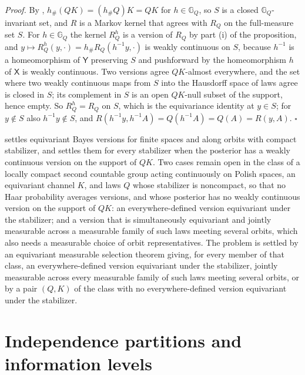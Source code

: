 \noindent\emph{Proof.}
By , $h_\#(QK)=(h_\#Q)K=QK$ for $h\in\mathbb G_Q$, so $S$ is a
closed $\mathbb G_Q$-invariant set, and $R$ is a Markov kernel that agrees with $R_Q$ on the full-measure
set $S$. For $h\in\mathbb G_Q$ the kernel $R_Q^h$ is a version of $R_Q$ by part (i) of the proposition,
and $y\mapsto R_Q^h(y,\cdot)=h_\#R_Q(h^{-1}y,\cdot)$ is weakly continuous on $S$, because $h^{-1}$ is a
homeomorphism of $\mathsf Y$ preserving $S$ and pushforward by the homeomorphism $h$ of $\mathsf X$ is
weakly continuous. Two versions agree $QK$-almost everywhere, and the set where two weakly continuous
maps from $S$ into the Hausdorff space of laws agree is closed in $S$; its complement in $S$ is an open
$QK$-null subset of the support, hence empty. So $R_Q^h=R_Q$ on $S$, which is the equivariance identity
at $y\in S$; for $y\notin S$ also $h^{-1}y\notin S$, and $R(h^{-1}y,h^{-1}A)=Q(h^{-1}A)=Q(A)=R(y,A)$.
$\square$

 settles equivariant Bayes versions for finite spaces and
along orbits with compact stabilizer, and  settles them for
every stabilizer when the posterior has a weakly continuous version on the support of $QK$. Two cases
remain open in the class of a locally compact second countable group acting continuously on Polish
spaces, an equivariant channel $K$, and laws $Q$ whose stabilizer is noncompact, so that no Haar
probability averages versions, and whose posterior has no weakly continuous version on the support of
$QK$: an everywhere-defined version equivariant under the stabilizer; and a version that is
simultaneously equivariant and jointly measurable across a measurable family of such laws meeting
several orbits, which also needs a measurable choice of orbit representatives. The problem is settled
by an equivariant measurable selection theorem giving, for every member of that class, an
everywhere-defined version equivariant under the stabilizer, jointly measurable across every measurable
family of such laws meeting several orbits, or by a pair $(Q,K)$ of the class with no everywhere-defined
version equivariant under the stabilizer.

\section{Independence partitions and information levels}
\label{sec:cg-intrinsic-selection}


